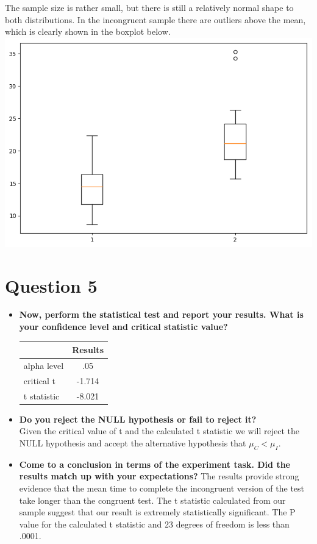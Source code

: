\documentclass[a4paper,11pt]{report}
\begin{document}
\begin{itemize}
    The sample size is rather small, but there is still a relatively normal shape to both distributions.  In the incongruent sample there are outliers above the mean, which is clearly shown in the boxplot below.\\
    \includegraphics[scale=.5]{boxplot}\\
  \end{itemize}
  
\section{Question 5}
  \begin{itemize}
    \item \textbf{Now, perform the statistical test and report your results. What is your confidence level and critical statistic value?}\\
    \begin{center}
      \begin{tabular}{|| l c||}
      \hline
      & Results \\
      \hline\hline
      alpha level & .05 \\
      \hline
      critical t & -1.714 \\
      \hline
      t statistic & -8.021 \\
      \hline
      \end{tabular}
    \end{center}
    
    \item \textbf{Do you reject the NULL hypothesis or fail to reject it?}\\
    Given the critical value of t and the calculated t statistic we will reject the NULL hypothesis and accept the alternative hypothesis that \( \mu_C < \mu_I \).
    \item \textbf{Come to a conclusion in terms of the experiment task.  Did the results match up with your expectations?}
    The results provide strong evidence that the mean time to complete the incongruent version of the test take longer than the congruent test.  The t statistic calculated from our sample suggest that our result is extremely statistically significant.  The P value for the calculated t statistic and 23 degrees of freedom is less than .0001.
    
  \end{itemize}
  
\end{document}
